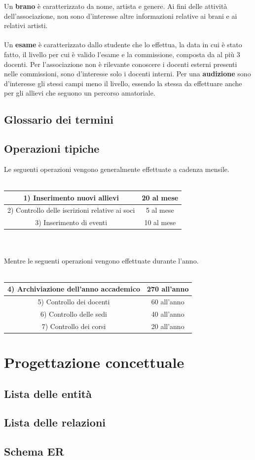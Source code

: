 \documentclass[12pt]{article}
\begin{document}
	Un \textbf{brano} è caratterizzato da nome, artista e genere. Ai fini delle attività dell'associazione, non sono d'interesse altre informazioni relative ai brani e ai relativi artisti.\\\\
	Un \textbf{esame} è caratterizzato dallo studente che lo effettua, la data in cui è stato fatto, il livello per cui è valido l'esame e la commissione, composta da al più 3 docenti. Per l'associazione non è rilevante conoscere i docenti esterni presenti nelle commissioni, sono d'interesse solo i docenti interni. Per una \textbf{audizione} sono d'interesse gli stessi campi meno il livello, essendo la stessa da effettuare anche per gli allievi che seguono un percorso amatoriale.
	\subsection{Glossario dei termini}
	\subsection{Operazioni tipiche}
		Le seguenti operazioni vengono generalmente effettuate a cadenza mensile.\\\\
		\vline
		\begin{tabular}{c|c}
			\hline
			1) Inserimento nuovi allievi & 20 al mese\\
			\hline
			2) Controllo delle iscrizioni relative ai soci & 5 al mese\\
			\hline
			3) Inserimento di eventi & 10 al mese\\
			\hline
		\end{tabular}
		\vline \\\\
		Mentre le seguenti operazioni vengono effettuate durante l'anno.\\\\
		\vline
		\begin{tabular}{c|c}
			\hline
			4) Archiviazione dell'anno accademico & 270 all'anno\\
			\hline
			5) Controllo dei docenti & 60 all'anno\\
			\hline
			6) Controllo delle sedi & 40 all'anno\\
			\hline
			7) Controllo dei corsi & 20 all'anno\\
			\hline
		\end{tabular}
		\vline
\section{Progettazione concettuale}
	\subsection{Lista delle entità}
	\subsection{Lista delle relazioni}
	\subsection{Schema ER}
\end{document}
